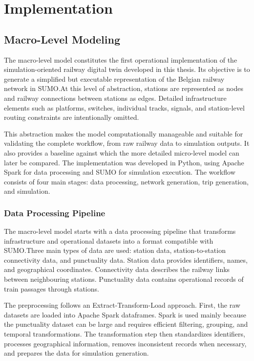\chapter{Implementation}\label{chap:implementation}

\section{Macro-Level Modeling}
The macro-level model constitutes the first operational implementation of the simulation-oriented railway digital twin 
developed in this thesis. Its objective is to generate a simplified but executable representation of the Belgian railway 
network in SUMO.\@ At this level of abstraction, stations are represented as nodes and railway connections between stations 
as edges. Detailed infrastructure elements such as platforms, switches, individual tracks, signals, and station-level 
routing constraints are intentionally omitted.

This abstraction makes the model computationally manageable and suitable for validating the complete workflow, from raw 
railway data to simulation outputs. It also provides a baseline against which the more detailed micro-level model can 
later be compared. The implementation was developed in Python, using Apache Spark for data processing and SUMO for 
simulation execution. The workflow consists of four main stages: data processing, network generation, trip generation, and 
simulation.

\subsection{Data Processing Pipeline}
The macro-level model starts with a data processing pipeline that transforms infrastructure and operational datasets into 
a format compatible with SUMO.\@ Three main types of data are used: station data, station-to-station connectivity data, 
and punctuality data. Station data provides identifiers, names, and geographical coordinates. Connectivity data describes 
the railway links between neighbouring stations. Punctuality data contains operational records of train passages through 
stations.

The preprocessing follows an Extract-Transform-Load approach. First, the raw datasets are loaded into Apache Spark 
dataframes. Spark is used mainly because the punctuality dataset can be large and requires efficient filtering, grouping, 
and temporal transformations. The transformation step then standardizes identifiers, processes geographical information, 
removes inconsistent records when necessary, and prepares the data for simulation generation.

